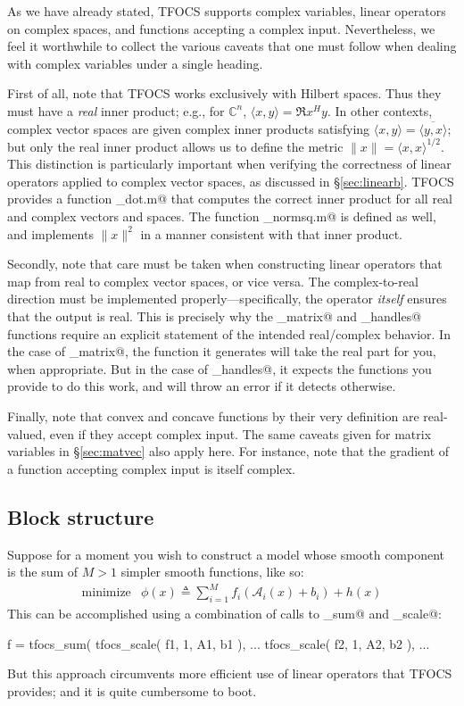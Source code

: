 \documentclass{article}
\newcommand{\cA}{\ensuremath{\mathcal{A}}}    %
\newcommand{\<}{\langle}
\renewcommand{\>}{\rangle}
\newcommand{\C}{\mathbb{C}}
\begin{document}
As we have already stated, TFOCS supports complex variables, linear
operators on complex spaces, and functions accepting a complex input.
Nevertheless, we feel it worthwhile to collect the various caveats
that one must follow when dealing with complex variables under a single
heading.

First of all, note that TFOCS works exclusively with Hilbert spaces.
Thus they must have a \emph{real} inner product; e.g., for
$\C^n$, $\<x,y\>=\Re x^H y$. In other contexts, complex vector
spaces are given complex inner products satisfying $\<x,y\>=\overline{\<y,x\>}$;
but only the real inner product allows us to define the metric
$\|x\|=\<x,x\>^{1/2}$. This distinction is particularly important when
verifying the correctness of linear operators applied to complex
vector spaces, as discussed in \S\ref{sec:linearb}. TFOCS provides
a function \verb@tfocs_dot.m@ that computes the correct inner
product for all real and complex vectors and spaces. The function
\verb@tfocs_normsq.m@ is defined as well, and implements $\|x\|^2$
in a manner consistent with that inner product.

Secondly, note that care must be taken when constructing
linear operators that map from real to complex vector spaces,
or vice versa. The complex-to-real 
direction must be implemented properly---specifically, the operator 
\emph{itself} ensures that the output is real. This is precisely
why the \verb@linop_matrix@ and \verb@linop_handles@ functions
require an explicit statement of the intended real/complex behavior.
In the case of \verb@linop_matrix@, the function it generates
will take the real part for you, when appropriate. But in
the case of \verb@linop_handles@, it expects the functions you
provide to do this work, and will throw an error if it detects otherwise.

Finally, note that convex and concave functions by their very 
definition are real-valued, even if they accept complex input.
The same caveats given for matrix variables in \S\ref{sec:matvec}
also apply here. For instance, note that the gradient of a function
accepting complex input is itself complex.

\subsection{Block structure}

Suppose for a moment you wish to construct a model whose smooth component
is the sum of $M>1$ simpler smooth functions, like so:
\begin{equation}
	\begin{array}{ll}
		\text{minimize} & \phi(x) \triangleq \sum_{i=1}^M f_i(\cA_i(x)+b_i) + h(x)
	\end{array}		
\end{equation}
This can be accomplished using a combination of
calls to \verb@tfocs_sum@ and \verb@tfocs_scale@:
\begin{code}
	f = tfocs_sum( tfocs_scale( f1, 1, A1, b1 ), ...
	               tfocs_scale( f2, 1, A2, b2 ), ...
\end{code}
But this approach circumvents more efficient use of linear operators that
TFOCS provides; and it is quite cumbersome to boot.
\end{document}
